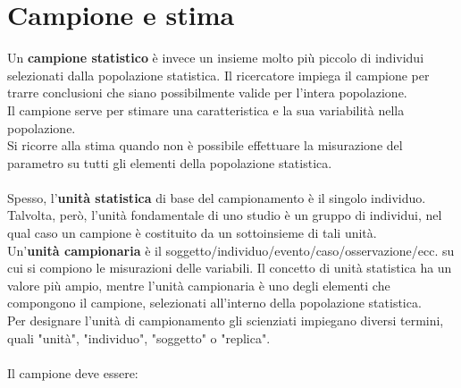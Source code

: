 \documentclass[10pt, draft]{book}
\begin{document}
\section{Campione e stima}
Un \textbf{campione statistico} è invece un insieme molto più piccolo di individui selezionati dalla popolazione statistica. Il ricercatore impiega il campione per trarre conclusioni che siano possibilmente valide per l'intera popolazione. 
\\
Il campione serve per stimare una caratteristica e la sua variabilità nella popolazione.
\\
Si ricorre alla stima quando non è possibile effettuare la misurazione del parametro su tutti gli elementi della popolazione statistica.
\\
\\
Spesso, l'\textbf{unità statistica} di base del campionamento è il singolo individuo. Talvolta, però, l'unità fondamentale di uno studio è un gruppo di individui, nel qual caso un campione è costituito da un sottoinsieme di tali unità. 
\\
Un'\textbf{unità campionaria} è il soggetto/individuo/evento/caso/osservazione/ecc. su cui si compiono le misurazioni delle variabili. Il concetto di unità statistica ha un valore più ampio, mentre l'unità campionaria è uno degli elementi che compongono il campione, selezionati all'interno della popolazione statistica.
\\
Per designare l'unità di campionamento gli scienziati impiegano diversi termini, quali "unità", "individuo", "soggetto" o "replica".
\\
\\
Il campione deve essere:
\end{document}
